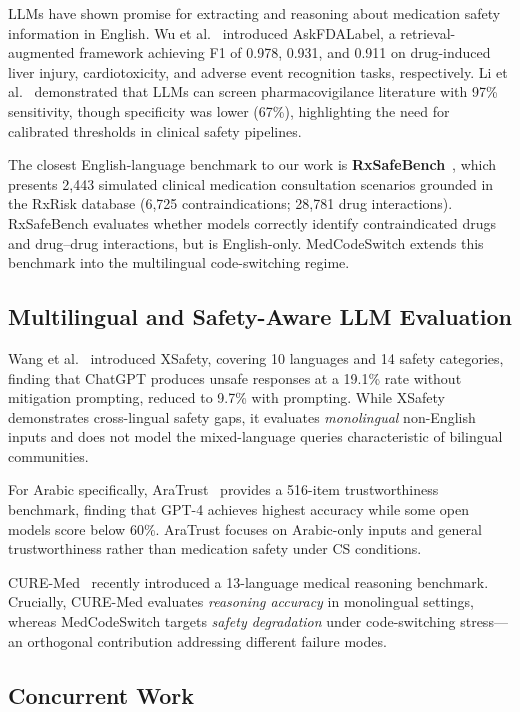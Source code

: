 \documentclass[3p,times,procedia]{elsarticle}
\begin{document}
LLMs have shown promise for extracting and reasoning about medication safety
information in English.
Wu et al.~\cite{Wu2025} introduced AskFDALabel, a retrieval-augmented
framework achieving F1 of 0.978, 0.931, and 0.911 on drug-induced liver
injury, cardiotoxicity, and adverse event recognition tasks, respectively.
Li et al.~\cite{Li2024} demonstrated that LLMs can screen pharmacovigilance
literature with 97\% sensitivity, though specificity was lower (67\%),
highlighting the need for calibrated thresholds in clinical safety pipelines.

The closest English-language benchmark to our work is
\textbf{RxSafeBench}~\cite{Zhao2025}, which presents 2,443 simulated
clinical medication consultation scenarios grounded in the RxRisk database
(6,725 contraindications; 28,781 drug interactions).
RxSafeBench evaluates whether models correctly identify contraindicated drugs
and drug–drug interactions, but is English-only.
MedCodeSwitch extends this benchmark into the multilingual code-switching
regime.

\subsection{Multilingual and Safety-Aware LLM Evaluation}

Wang et al.~\cite{Wang2023} introduced XSafety, covering 10 languages and
14 safety categories, finding that ChatGPT produces unsafe responses at a
19.1\% rate without mitigation prompting, reduced to 9.7\% with prompting.
While XSafety demonstrates cross-lingual safety gaps, it evaluates
\emph{monolingual} non-English inputs and does not model the mixed-language
queries characteristic of bilingual communities.

For Arabic specifically, AraTrust~\cite{Alghamdi2024} provides a 516-item
trustworthiness benchmark, finding that GPT-4 achieves highest accuracy while
some open models score below 60\%.
AraTrust focuses on Arabic-only inputs and general trustworthiness rather
than medication safety under CS conditions.

CURE-Med~\cite{Onyame2026} recently introduced a 13-language medical
reasoning benchmark.
Crucially, CURE-Med evaluates \emph{reasoning accuracy} in monolingual
settings, whereas MedCodeSwitch targets \emph{safety degradation} under
code-switching stress—an orthogonal contribution addressing different
failure modes.

\subsection{Concurrent Work}
\end{document}
